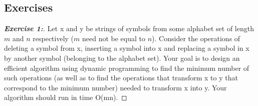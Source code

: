 \documentclass[a4paper]{article}
\newenvironment{exercise}[1]{\begin{proof}[\textnormal{\textbf{Exercise #1:}}]\phantom{\qedhere}}{\end{proof}}
\theoremstyle{definition}
\begin{document}
\subsection{Exercises}
\begin{exercise}{1}
 Let x and y be strings of symbols from some alphabet set of length $m$ and $n$ respectively ($m$ need not be equal to $n$). Consider the operations of deleting a symbol from x, inserting a symbol into x and replacing a symbol in x by another symbol (belonging to the alphabet set). Your goal is to design an efficient algorithm using dynamic programming to find the minimum number of such operations (as well as to find the operations that transform x to y that correspond to the minimum number) needed to transform x into y. Your algorithm should run in time O(mn).
\end{exercise}
\end{document}
